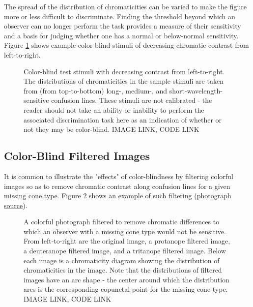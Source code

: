 \documentclass{article}
\newif\ifinvert
\begin{document}
The spread of the distribution of chromaticities can be varied to make the figure more or less difficult to discriminate. Finding the threshold beyond which an observer can no longer perform the task provides a measure of their sensitivity and a basis for judging whether one has a normal or below-normal sensitivity.  Figure \ref{fig:color_blind_stimuli_contrast} shows example color-blind stimuli of decreasing chromatic contrast from left-to-right.

\begin{figure} %
    \ifinvert
        
    \else
        
    \fi
    \caption{Color-blind test stimuli with decreasing contrast from left-to-right.  The distributions of chromaticities in the sample stimuli are taken from (from top-to-bottom) long-, medium-, and short-wavelength-sensitive confusion lines.  These stimuli are not calibrated - the reader should not take an ability or inability to perform the associated discrimination task here as an indication of whether or not they may be color-blind.  IMAGE LINK, CODE LINK}\label{fig:color_blind_stimuli_contrast}
\end{figure}

\subsection{Color-Blind Filtered Images} %

It is common to illustrate the "effects" of color-blindness by filtering colorful images so as to remove chromatic contrast along confusion lines for a given missing cone type.  Figure \ref{fig:color_blind_filter_photograph} shows an example of such filtering (photograph \href{https://pixabay.com/photos/flower-field-flowers-field-trees-250016/}{source}).

\begin{figure} %
    \ifinvert
        
    \else
        
    \fi
    \caption{A colorful photograph filtered to remove chromatic differences to which an observer with a missing cone type would not be sensitive.  From left-to-right are the original image, a protanope filtered image, a deuteranope filtered image, and a tritanope filtered image.  Below each image is a chromaticity diagram showing the distribution of chromaticities in the image.  Note that the distributions of filtered images have an arc shape - the center around which the distribution arcs is the corresponding copunctal point for the missing cone type.  IMAGE LINK, CODE LINK}\label{fig:color_blind_filter_photograph}
\end{figure}
\end{document}
